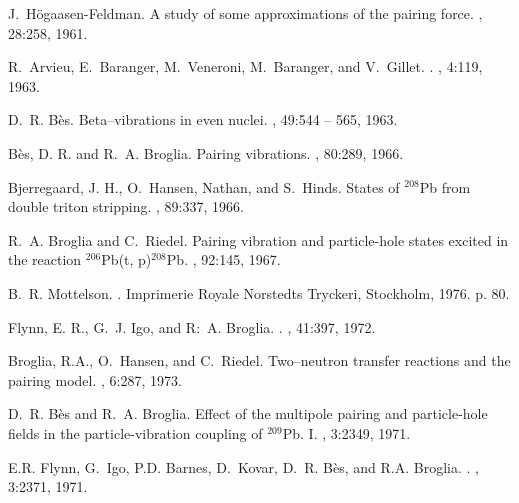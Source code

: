 \documentclass[a4paper,11pt]{article}
\numberwithin{equation}{section}
\numberwithin{figure}{section}
\numberwithin{table}{section}
\begin{document}
\begin{thebibliography}{10}
	J.~H\"ogaasen-Feldman.
	\newblock A study of some approximations of the pairing force.
	, 28:258, 1961.
	
	R.~Arvieu, E.~Baranger, M.~Veneroni, M.~Baranger, and V.~Gillet.
	.
	, 4:119, 1963.
	
	D.~R. B{\`{e}}s.
	\newblock Beta--vibrations in even nuclei.
	, 49:544 -- 565, 1963.
	
	{B{\`{e}}s, D. R.} and R.~A. Broglia.
	\newblock Pairing vibrations.
	, 80:289, 1966.
	
	{Bjerregaard, J. H.}, O.~Hansen, Nathan, and S.~Hinds.
	\newblock States of {$^{208}$Pb} from double triton stripping.
	, 89:337, 1966.
	
	R.~A. Broglia and C.~Riedel.
	\newblock Pairing vibration and particle-hole states excited in the reaction
	$^{206}${P}b(t, p)$^{208}${P}b.
	, 92:145, 1967.
	
	B.~R. Mottelson.
	.
	\newblock Imprimerie Royale Norstedts Tryckeri, Stockholm, 1976.
	\newblock p. 80.
	
	{Flynn, E. R.}, G.~J. Igo, and R:~A. Broglia.
	.
	, 41:397, 1972.
	
	{Broglia, R.A.}, O.~Hansen, and C.~Riedel.
	\newblock Two--neutron transfer reactions and the pairing model.
	, 6:287, 1973.
	
	D.~R. B{\`{e}}s and R.~A. Broglia.
	\newblock Effect of the multipole pairing and particle-hole fields in the
	particle-vibration coupling of $^{209}${P}b. {I}.
	, 3:2349, 1971.
	
	E.R. Flynn, G.~Igo, P.D. Barnes, D.~Kovar, D.~R. B\`{e}s, and R.A. Broglia.
	.
	, 3:2371, 1971.
	

\end{thebibliography}
\end{document}
